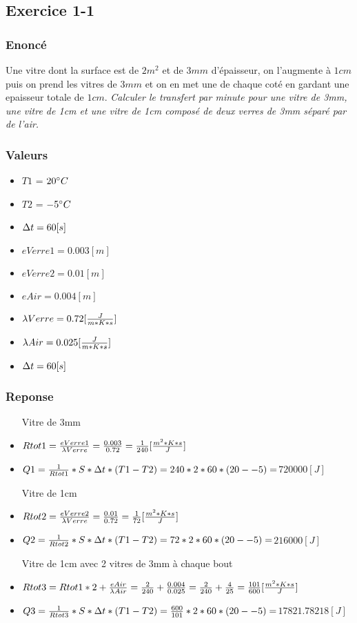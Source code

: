 \subsection{Exercice 1-1}
\subsubsection{Enoncé}
Une vitre dont la surface est de $2m^2$ et de $3mm$ d'épaisseur, on l'augmente à $1cm$ puis on prend les vitres de $3mm$ et on en met une de chaque coté en gardant une epaisseur totale de $1cm$.
\textit{Calculer le transfert par minute pour une vitre de 3mm, une vitre de 1cm et une vitre de 1cm composé de deux verres de 3mm séparé par de l'air.}
\subsubsection{Valeurs}
\begin{itemize}
    \item $T1$ = $20\celsius$
    \item $T2$ = $-5\celsius$
    \item $\dt = 60[s]$
    \item $eVerre1 = 0.003[m]$
    \item $eVerre2 = 0.01[m]$
    \item $eAir = 0.004[m]$
    \item ${\lambda}Verre = 0.72 [\lbda]$
    \item ${\lambda}Air = 0.025 [\lbda]$
    \item $\dt = 60[s]$
\end{itemize}
\subsubsection{Reponse}
\begin{itemize}
    \item[Vitre de 3mm]
    \item $Rtot1 = \frac{eVerre1}{{\lambda}Verre} = \frac{0.003}{0.72} =  \frac{1}{240}[\rtot]$
    \item $Q1 = \frac{1}{Rtot1} * S * \dt * (T1 - T2) = 240 * 2 * 60 * (20--5) = $\underline{$720000[J]$}
    \item[Vitre de 1cm]
    \item $Rtot2 = \frac{eVerre2}{{\lambda}Verre} = \frac{0.01}{0.72} = \frac{1}{72}[\rtot]$
    \item $Q2 = \frac{1}{Rtot2} * S * \dt * (T1-T2) = 72 * 2 * 60 * (20--5) = $\underline{$216000[J]$}
    \item[Vitre de 1cm avec 2 vitres de 3mm à chaque bout]
    \item $Rtot3 = Rtot1*2+\frac{eAir}{{\lambda}Air} = \frac{2}{240} + \frac{0.004}{0.025} = \frac{2}{240} + \frac{4}{25} = \frac{101}{600}[\rtot]$
    \item $Q3 = \frac{1}{Rtot3} * S * \dt * (T1-T2) = \frac{600}{101} * 2 * 60 * (20--5) = $\underline{$17821.78218[J]$} 
\end{itemize}


